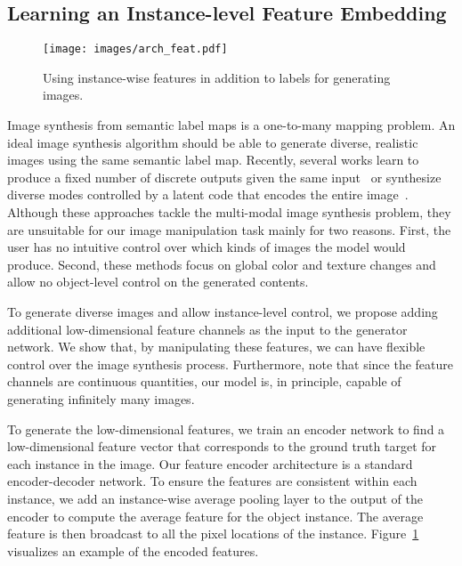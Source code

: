 \documentclass[10pt,twocolumn,letterpaper]{article}
\newcommand{\lblfig}[1]{\label{fig:#1}}
\newcommand{\lblsec}[1]{\label{sec:#1}}
\begin{document}
\subsection{Learning an Instance-level Feature Embedding}
\lblsec{alg:feat}
\begin{figure}
  \centering
  \texttt{[image: images/arch\_feat.pdf]}   
  \caption{Using instance-wise features in addition to labels for generating images. 
  }
  \lblfig{feat}
\end{figure}

Image synthesis from semantic label maps is a one-to-many mapping problem. An ideal image synthesis algorithm should be able to generate diverse, realistic images using the same semantic label map. Recently, several works learn to produce a fixed number of discrete outputs given the same input~\cite{ghosh2017multi,chen2017photographic} or synthesize diverse modes controlled by a latent code that encodes the entire image~\cite{zhu2017toward}. Although these approaches tackle the multi-modal image synthesis problem, they are unsuitable for our image manipulation task mainly for two reasons.
First, the user has no intuitive control over which kinds of images the model would produce\cite{ghosh2017multi,chen2017photographic}.
Second, these methods focus on global color and texture changes and allow no object-level control on the generated contents. 

To generate diverse images and allow instance-level control, we propose adding additional low-dimensional feature channels as the input to the generator network. We show that, by manipulating these features, we can have flexible control over the image synthesis process. Furthermore, note that since the feature channels are continuous quantities, our model is, in principle, capable of generating infinitely many images.

To generate the low-dimensional features, we train an encoder network  to find a low-dimensional feature vector that corresponds to the ground truth target for each instance in the image. Our feature encoder architecture is a standard encoder-decoder network. To ensure the features are consistent within each instance, we add an instance-wise average pooling layer to the output of the encoder to compute the average feature for the object instance. The average feature is then broadcast to all the pixel locations of the instance. Figure~\ref{fig:feat} visualizes an example of the encoded features.
\end{document}
